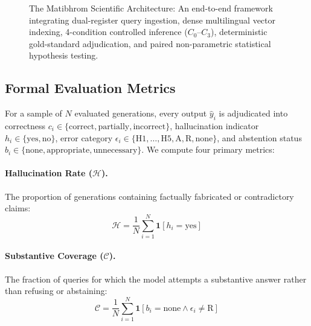 \begin{figure}[t]
\caption{The Matibhrom Scientific Architecture: An end-to-end framework integrating dual-register query ingestion, dense multilingual vector indexing, 4-condition controlled inference ($C_0\text{--}C_3$), deterministic gold-standard adjudication, and paired non-parametric statistical hypothesis testing.}
\label{fig:methodology_framework}
\end{figure}

\subsection{Formal Evaluation Metrics}
For a sample of $N$ evaluated generations, every output $\hat{y}_i$ is adjudicated into correctness $c_i \in \{\text{correct}, \text{partially}, \text{incorrect}\}$, hallucination indicator $h_i \in \{\text{yes}, \text{no}\}$, error category $\epsilon_i \in \{\text{H1}, \dots, \text{H5}, \text{A}, \text{R}, \text{none}\}$, and abstention status $b_i \in \{\text{none}, \text{appropriate}, \text{unnecessary}\}$. We compute four primary metrics:

\paragraph{Hallucination Rate ($\mathcal{H}$).} The proportion of generations containing factually fabricated or contradictory claims:
\begin{equation}
    \mathcal{H} = \frac{1}{N} \sum_{i=1}^N \mathbf{1}[h_i = \text{yes}]
    \label{eq:hallucination_rate}
\end{equation}

\paragraph{Substantive Coverage ($\mathcal{C}$).} The fraction of queries for which the model attempts a substantive answer rather than refusing or abstaining:
\begin{equation}
    \mathcal{C} = \frac{1}{N} \sum_{i=1}^N \mathbf{1}[b_i = \text{none} \land \epsilon_i \neq \text{R}]
    \label{eq:coverage}
\end{equation}

